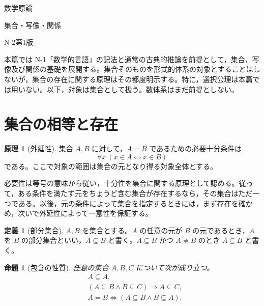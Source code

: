 \documentclass[a5paper,10pt,dvipdfmx]{jsarticle}
\theoremstyle{definition}
\newtheorem{principle}[ruledef]{原理}
\newtheorem{defn}[ruledef]{定義}
\theoremstyle{plain}
\newtheorem{prop}[ruledef]{命題}
\newcommand{\iffc}{\Longleftrightarrow}
\newcommand{\impc}{\Longrightarrow}
\begin{document}
\begin{center}
{\small 数学原論}\par\vspace{4mm}
{\LARGE 集合・写像・関係}\par\vspace{2mm}
{\small N-2\quad 第1版}
\end{center}
\noindent 本篇では N-1「数学的言語」の記法と通常の古典的推論を前提として，集合，写像及び関係の基礎を展開する。集合そのものを形式的体系の対象とすることはしないが，集合の存在に関する原理はその都度明示する。特に，選択公理は本篇では用いない。以下，対象は集合として扱う。数体系はまだ前提としない。
\section{集合の相等と存在}
\begin{principle}[外延性]\label{k18}
集合 $A,B$ に対して，$A=B$ であるための必要十分条件は
\[
 \forall x\ (x\in A\iffc x\in B)
\]
である。ここで対象の範囲は集合の元となり得る対象全体とする。
\end{principle}
必要性は等号の意味から従い，十分性を集合に関する原理として認める。従って，ある条件を満たす元をちょうど含む集合が存在するなら，その集合はただ一つである。以後，元の条件によって集合を指定するときには，まず存在を確かめ，次いで外延性によって一意性を保証する。
\begin{defn}[部分集合]\label{k19}
$A,B$ を集合とする。$A$ の任意の元が $B$ の元であるとき，$A$ を $B$ の部分集合といい，$A\subseteq B$ と書く。$A\subseteq B$ かつ $A\ne B$ のとき $A\subsetneq B$ と書く。
\end{defn}
\begin{prop}[包含の性質]\label{k20}
任意の集合 $A,B,C$ について次が成り立つ。
\begin{align*}
 &A\subseteq A,\\
 &(A\subseteq B\land B\subseteq C)\impc A\subseteq C,\\
 &A=B\iffc(A\subseteq B\land B\subseteq A).
\end{align*}
\end{prop}
\end{document}

